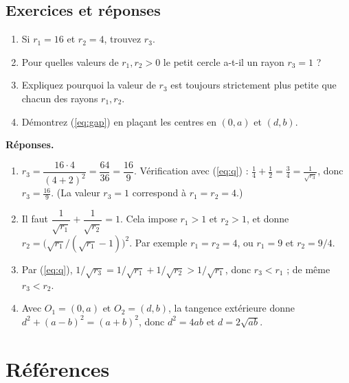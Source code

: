 \subsection{Exercices et réponses}
\begin{enumerate}
 \item Si $r_1=16$ et $r_2=4$, trouvez $r_3$.
 \item Pour quelles valeurs de $r_1,r_2>0$ le petit cercle a-t-il un rayon $r_3=1$ ?
 \item Expliquez pourquoi la valeur de $r_3$ est toujours strictement plus petite que chacun des rayons $r_1,r_2$.
 \item Démontrez (\ref{eq:gap}) en plaçant les centres en $(0,a)$ et $(d,b)$.
\end{enumerate}
\textbf{Réponses.}
\begin{enumerate}
 \item $r_3=\dfrac{16\cdot4}{(4+2)^2}=\dfrac{64}{36}=\dfrac{16}{9}$. Vérification avec (\ref{eq:q}) : $\frac14+\frac12=\frac34=\frac1{\sqrt{r_3}}$, donc $r_3=\frac{16}{9}$. (La valeur $r_3=1$ correspond à $r_1=r_2=4$.)
 \item Il faut $\dfrac1{\sqrt{r_1}}+\dfrac1{\sqrt{r_2}}=1$. Cela impose $r_1>1$ et $r_2>1$, et donne $r_2=\bigl(\sqrt{r_1}/(\sqrt{r_1}-1)\bigr)^2$. Par exemple $r_1=r_2=4$, ou $r_1=9$ et $r_2=9/4$.
 \item Par (\ref{eq:q}), $1/\sqrt{r_3}=1/\sqrt{r_1}+1/\sqrt{r_2}>1/\sqrt{r_1}$, donc $r_3<r_1$ ; de même $r_3<r_2$.
 \item Avec $O_1=(0,a)$ et $O_2=(d,b)$, la tangence extérieure donne $d^2+(a-b)^2=(a+b)^2$, donc $d^2=4ab$ et $d=2\sqrt{ab}$.
\end{enumerate}

\section*{Références}
\begin{enumerate}
\end{enumerate}

